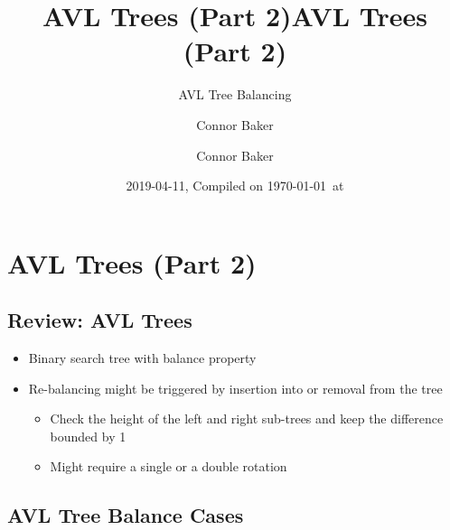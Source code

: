 \documentclass[
  10pt,
  english,
  letterpaper,
,tablecaptionabove
]{scrartcl}
\title{AVL Trees (Part 2)}
\subtitle{AVL Tree Balancing}
\author{Connor Baker}
\date{2019-04-11, Compiled on \today~at \currenttime}
\title{AVL Trees (Part 2)}
\author{Connor Baker}
\providecommand{\tightlist}{%
  \setlength{\itemsep}{0pt}\setlength{\parskip}{0pt}}
\begin{document}

\begin{titlepage}
\afterpage{\restorepagecolor}
\newcommand{\colorRule}[3][black]{\textcolor[HTML]{#1}{\rule{#2}{#3}}}
\end{titlepage}
\restoregeometry




\hypertarget{avl-trees-part-2}{%
\section{AVL Trees (Part 2)}\label{avl-trees-part-2}}

\hypertarget{review-avl-trees}{%
\subsection{Review: AVL Trees}\label{review-avl-trees}}

\begin{itemize}
\tightlist
\item
  Binary search tree with balance property
\item
  Re-balancing might be triggered by insertion into or removal from the
  tree

  \begin{itemize}
  \tightlist
  \item
    Check the height of the left and right sub-trees and keep the
    difference bounded by 1
  \item
    Might require a single or a double rotation
  \end{itemize}
\end{itemize}

\hypertarget{avl-tree-balance-cases}{%
\subsection{AVL Tree Balance Cases}\label{avl-tree-balance-cases}}
\end{document}
